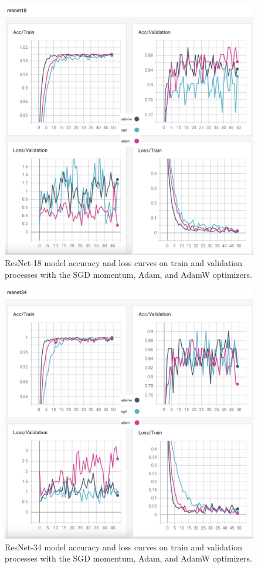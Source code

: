 \begin{figure}[!h]
    \centering
    \includegraphics[width=\linewidth]{fig/resnet18.png}
    \vspace{2mm}
    \caption{ResNet-18 model accuracy and loss curves on train and validation processes with the SGD momentum, Adam, and AdamW optimizers.}
    \label{fig:resnet18_plots}
\end{figure}

\begin{figure}[!h]
    \centering
    \includegraphics[width=\linewidth]{fig/resnet34.png}
    \vspace{2mm}
    \caption{ResNet-34 model accuracy and loss curves on train and validation processes with the SGD momentum, Adam, and AdamW optimizers.}
    \label{fig:resnet34_plots}
\end{figure}

